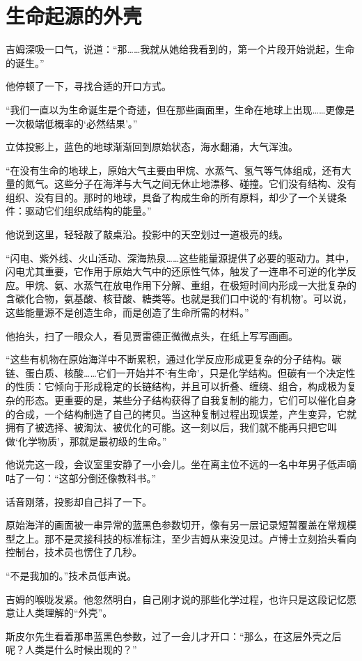 \chapter{生命起源的外壳}

吉姆深吸一口气，说道：“那……我就从她给我看到的，第一个片段开始说起，生命的诞生。”

他停顿了一下，寻找合适的开口方式。

“我们一直以为生命诞生是个奇迹，但在那些画面里，生命在地球上出现……更像是一次极端低概率的‘必然结果’。”

立体投影上，蓝色的地球渐渐回到原始状态，海水翻涌，大气浑浊。

“在没有生命的地球上，原始大气主要由甲烷、水蒸气、氢气等气体组成，还有大量的氮气。这些分子在海洋与大气之间无休止地漂移、碰撞。它们没有结构、没有组织、没有目的。那时的地球，具备了构成生命的所有原料，却少了一个关键条件：驱动它们组织成结构的能量。”

他说到这里，轻轻敲了敲桌沿。投影中的天空划过一道极亮的线。

“闪电、紫外线、火山活动、深海热泉……这些能量源提供了必要的驱动力。其中，闪电尤其重要，它作用于原始大气中的还原性气体，触发了一连串不可逆的化学反应。甲烷、氨、水蒸气在放电作用下分解、重组，在极短时间内形成一大批复杂的含碳化合物，氨基酸、核苷酸、糖类等。也就是我们口中说的‘有机物’。可以说，这些能量源不是创造生命，而是创造了生命所需的材料。”

他抬头，扫了一眼众人，看见贾雷德正微微点头，在纸上写写画画。

“这些有机物在原始海洋中不断累积，通过化学反应形成更复杂的分子结构。碳链、蛋白质、核酸……它们一开始并不‘有生命’，只是化学结构。但碳有一个决定性的性质：它倾向于形成稳定的长链结构，并且可以折叠、缠绕、组合，构成极为复杂的形态。更重要的是，某些分子结构获得了自我复制的能力，它们可以催化自身的合成，一个结构制造了自己的拷贝。当这种复制过程出现误差，产生变异，它就拥有了被选择、被淘汰、被优化的可能。这一刻以后，我们就不能再只把它叫做‘化学物质’，那就是最初级的生命。”

他说完这一段，会议室里安静了一小会儿。坐在离主位不远的一名中年男子低声嘀咕了一句：“这部分倒还像教科书。”

话音刚落，投影却自己抖了一下。

原始海洋的画面被一串异常的蓝黑色参数切开，像有另一层记录短暂覆盖在常规模型之上。那不是灵接科技的标准标注，至少吉姆从来没见过。卢博士立刻抬头看向控制台，技术员也愣住了几秒。

“不是我加的。”技术员低声说。

吉姆的喉咙发紧。他忽然明白，自己刚才说的那些化学过程，也许只是这段记忆愿意让人类理解的“外壳”。

斯皮尔先生看着那串蓝黑色参数，过了一会儿才开口：“那么，在这层外壳之后呢？人类是什么时候出现的？”
